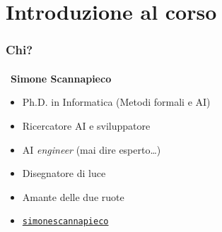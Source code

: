 \section{Introduzione al corso} %
\label{sec:intro}

{
    \begin{frame}[t, fragile] \frametitle{Chi?}
    \framesubtitle{\phantom{\_}}
        \vspace*{-5pt}
        \hspace*{-13pt}
        {\huge
            \color{white} \faUser\ \textbf{Simone Scannapieco}
        }
        {
            \begin{itemize}[leftmargin=10pt,align=right]
                \setlength\itemsep{.7em}
                \item[\color{white}\faBook] \color{white} Ph.D. in Informatica (Metodi formali e AI)
                \item[\color{white}\faBriefcase] \color{white} Ricercatore AI e sviluppatore
                \item[\color{white}\faCodeFork] \color{white} AI \emph{engineer} (mai dire esperto\ldots)
                \item[\color{white}\faCameraRetro] \color{white} Disegnatore di luce
                \item[\color{white}\faBicycle] \color{white} Amante delle due ruote
                \item[\color{white}\faLinkedin] \color{white} \href{https://www.linkedin.com/in/simonescannapieco/}{\texttt{simonescannapieco}}
            \end{itemize}
        }
    \end{frame}
}

